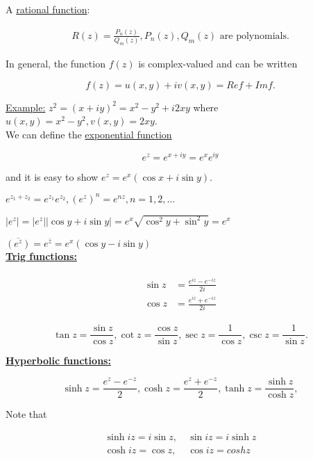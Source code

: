 \documentclass[twoside]{article}
\newcommand*\mean[1]{\bar{#1}}
\begin{document}
A \underline{rational function}:

\begin{equation}
	\begin{split}
		R(z)=\frac{P_n(z)}{Q_m(z)}, P_n(z), Q_m(z)\text{ are polynomials}.
	\end{split}
\end{equation}

In general, the function $f(z)$ is complex-valued and can be written

$$f(z)=u(x,y)+iv(x,y)=Ref+ Imf.$$

\underline{Example:} $z^2=(x+iy)^2=x^2-y^2+i2xy$ where $u(x,y)=x^2-y^2, v(x,y)=2xy$.\\

We can define the \underline{exponential function}

$$e^z=e^{x+iy}=e^xe^{iy}$$

and it is easy to show $e^z=e^x(\cos x+i\sin y).$

	$e^{z_1+z_2}=e^{z_1}e^{z_2}, \left(e^z\right)^n=e^{nz},n=1,2,\dots$
	
	$\lvert e^z\rvert =\lvert e^z\rvert \lvert \cos y +i\sin y\rvert =e^x\sqrt{\cos^2 y +\sin^2 y}= e^x$
		
	$\overline{(e^z)}=e^{\mean{z}}=e^x(\cos y- i\sin y)$\\
	
\underline{\textbf{Trig functions:}}

\begin{equation}
	\begin{split}
		\begin{split}\sin z&=\frac{e^{iz}-e^{-iz}}{2i}\\
		\cos z &=\frac{e^{iz}+e^{-iz}}{2i}
		\end{split}
	\end{split}
\end{equation}


$$\tan z=\frac{\sin z}{\cos z}, \cot z=\frac{\cos z}{\sin z}, \sec z=\frac{1}{\cos z}, \csc z=\frac{1}{\sin z}.$$

\underline{\textbf{Hyperbolic functions:}}

$$\sinh z =\frac{e^z-e^{-z}}{2}, \cosh z =\frac{e^z+e^{-z}}{2}, \tanh z=\frac{\sinh z}{\cosh z},$$

Note that

\begin{equation}
	\begin{split}
		\sinh iz = i\sin z,&\ \sin iz =i\sinh z\\
		\cosh iz = \cos z,&\ \cos iz =cosh z\\
	\end{split}
\end{equation}
\end{document}

